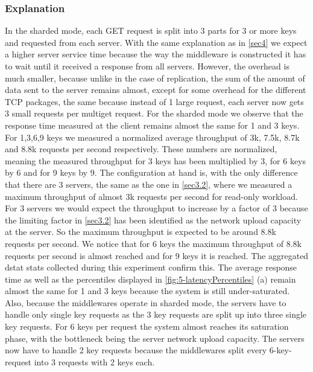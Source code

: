 \documentclass[11pt,a4paper]{article}
\begin{document}
\subsubsection{Explanation}
In the sharded mode, each GET request is split into 3 parts for 3 or more keys and requested from each server. With the same explanation as in \autoref{sec4} we expect a higher server service time because the way the middleware is constructed it has to wait until it received a response from all servers. However, the overhead is much smaller, because unlike in the case of replication, the sum of the amount of data sent to the server remains almost, except for some overhead for the different TCP packages, the same because instead of 1 large request, each server now gets 3 small requests per multiget request.
For the sharded mode we observe that the response time measured at the client remains almost the same for 1 and 3 keys. For 1,3,6,9 keys we measured a normalized average throughput of 3k, 7.5k, 8.7k and 8.8k requests per second respectively. These numbers are normalized, meaning the measured throughput for 3 keys has been multiplied by 3, for 6 keys by 6 and for 9 keys by 9.
The configuration at hand is, with the only difference that there are 3 servers, the same as the one in \autoref{sec3.2}, where we measured a maximum throughput of almost 3k requests per second for read-only workload. For 3 servers we would expect the throughput to increase by a factor of 3 because the limiting factor in \autoref{sec3.2} has been identified as the network upload capacity at the server. So the maximum throughput is expected to be around 8.8k requests per second.
We notice that for 6 keys the maximum throughput of 8.8k requests per second is almost reached and for 9 keys it is reached. The aggregated dstat stats collected during this experiment confirm this.
The average response time as well as the percentiles displayed in \autoref{fig:5-latencyPercentiles} (a) remain almost the same for 1 and 3 keys because the system is still under-saturated. Also, because the middlewares operate in sharded mode, the servers have to handle only single key requests as the 3 key requests are split up into three single key requests.
For 6 keys per request the system almost reaches its saturation phase, with the bottleneck being the server network upload capacity. The servers now have to handle 2 key requests because the middlewares split every 6-key-request into 3 requests with 2 keys each.
\end{document}
